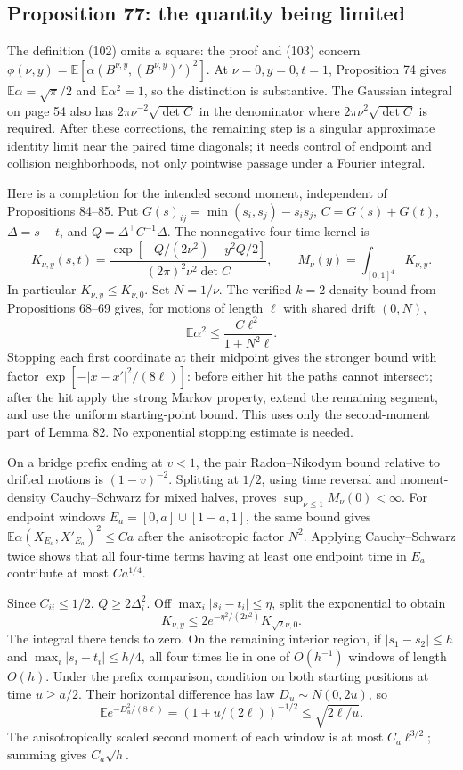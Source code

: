 \documentclass[10pt]{article}
\begin{document}
\subsection*{Proposition 77: the quantity being limited}
The definition (102) omits a square: the proof and (103) concern \(\phi(\nu,y)=\mathbb E[\alpha(B^{\nu,y},(B^{\nu,y})')^2]\). At \(\nu=0,y=0,t=1\), Proposition 74 gives \(\mathbb E\alpha=\sqrt{\pi}/2\) and \(\mathbb E\alpha^2=1\), so the distinction is substantive. The Gaussian integral on page 54 also has \(2\pi\nu^{-2}\sqrt{\det C}\) in the denominator where \(2\pi\nu^2\sqrt{\det C}\) is required. After these corrections, the remaining step is a singular approximate identity limit near the paired time diagonals; it needs control of endpoint and collision neighborhoods, not only pointwise passage under a Fourier integral.\par
Here is a completion for the intended second moment, independent of Propositions 84–85. Put \(G(s)_{ij}=\min(s_i,s_j)-s_i s_j\), \(C=G(s)+G(t)\), \(\Delta=s-t\), and \(Q=\Delta^\top C^{-1}\Delta\). The nonnegative four-time kernel is \[K_{\nu,y}(s,t)
 =\frac{\exp[-Q/(2\nu^2)-y^2Q/2]}
 {(2\pi)^2\nu^2\det C},\qquad
 M_\nu(y)=\int_{[0,1]^4}K_{\nu,y}.\] In particular \(K_{\nu,y}\le K_{\nu,0}\). Set \(N=1/\nu\). The verified \(k=2\) density bound from Propositions 68–69 gives, for motions of length \(\ell\) with shared drift \((0,N)\), \[\mathbb E\alpha^2\le\frac{C\ell^2}{1+N^2\ell}.\] Stopping each first coordinate at their midpoint gives the stronger bound with factor \(\exp[-|x-x'|^2/(8\ell)]\): before either hit the paths cannot intersect; after the hit apply the strong Markov property, extend the remaining segment, and use the uniform starting-point bound. This uses only the second-moment part of Lemma 82. No exponential stopping estimate is needed.\par
On a bridge prefix ending at \(v<1\), the pair Radon–Nikodym bound relative to drifted motions is \((1-v)^{-2}\). Splitting at \(1/2\), using time reversal and moment-density Cauchy–Schwarz for mixed halves, proves \(\sup_{\nu\le1}M_\nu(0)<\infty\). For endpoint windows \(E_a=[0,a]\cup[1-a,1]\), the same bound gives \(\mathbb E\alpha(X_{E_a},X'_{E_a})^2\le Ca\) after the anisotropic factor \(N^2\). Applying Cauchy–Schwarz twice shows that all four-time terms having at least one endpoint time in \(E_a\) contribute at most \(Ca^{1/4}\).\par
Since \(C_{ii}\le1/2\), \(Q\ge2\Delta_i^2\). Off \(\max_i|s_i-t_i|\le\eta\), split the exponential to obtain \[K_{\nu,y}\le2e^{-\eta^2/(2\nu^2)}K_{\sqrt2\nu,0}.\] The integral there tends to zero. On the remaining interior region, if \(|s_1-s_2|\le h\) and \(\max_i|s_i-t_i|\le h/4\), all four times lie in one of \(O(h^{-1})\) windows of length \(O(h)\). Under the prefix comparison, condition on both starting positions at time \(u\ge a/2\). Their horizontal difference has law \(D_u\sim N(0,2u)\), so \[\mathbb Ee^{-D_u^2/(8\ell)}
 =(1+u/(2\ell))^{-1/2}\le\sqrt{2\ell/u}.\] The anisotropically scaled second moment of each window is at most \(C_a\ell^{3/2}\); summing gives \(C_a\sqrt h\).\par
\end{document}
